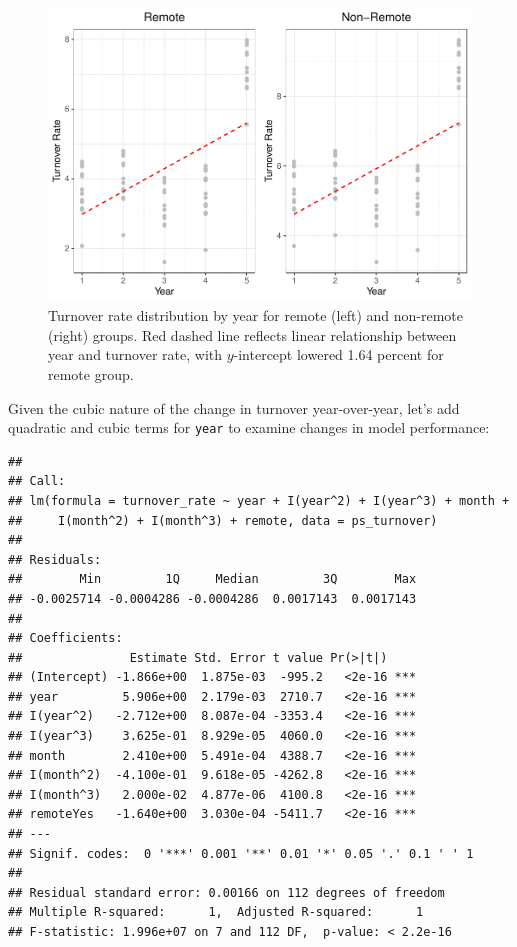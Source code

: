 \documentclass[
]{book}
\begin{document}
\begin{figure}

{\centering \includegraphics[width=1\linewidth]{The_Fundamentals_of_People_Analytics_files/figure-latex/ps-turnover-yrly-dist-1} 

}

\caption{Turnover rate distribution by year for remote (left) and non-remote (right) groups. Red dashed line reflects linear relationship between year and turnover rate, with $y$-intercept lowered 1.64 percent for remote group.}\label{fig:ps-turnover-yrly-dist}
\end{figure}

Given the cubic nature of the change in turnover year-over-year, let's add quadratic and cubic terms for \texttt{year} to examine changes in model performance:

\begin{verbatim}
## 
## Call:
## lm(formula = turnover_rate ~ year + I(year^2) + I(year^3) + month + 
##     I(month^2) + I(month^3) + remote, data = ps_turnover)
## 
## Residuals:
##        Min         1Q     Median         3Q        Max 
## -0.0025714 -0.0004286 -0.0004286  0.0017143  0.0017143 
## 
## Coefficients:
##               Estimate Std. Error t value Pr(>|t|)    
## (Intercept) -1.866e+00  1.875e-03  -995.2   <2e-16 ***
## year         5.906e+00  2.179e-03  2710.7   <2e-16 ***
## I(year^2)   -2.712e+00  8.087e-04 -3353.4   <2e-16 ***
## I(year^3)    3.625e-01  8.929e-05  4060.0   <2e-16 ***
## month        2.410e+00  5.491e-04  4388.7   <2e-16 ***
## I(month^2)  -4.100e-01  9.618e-05 -4262.8   <2e-16 ***
## I(month^3)   2.000e-02  4.877e-06  4100.8   <2e-16 ***
## remoteYes   -1.640e+00  3.030e-04 -5411.7   <2e-16 ***
## ---
## Signif. codes:  0 '***' 0.001 '**' 0.01 '*' 0.05 '.' 0.1 ' ' 1
## 
## Residual standard error: 0.00166 on 112 degrees of freedom
## Multiple R-squared:      1,  Adjusted R-squared:      1 
## F-statistic: 1.996e+07 on 7 and 112 DF,  p-value: < 2.2e-16
\end{verbatim}
\end{document}
